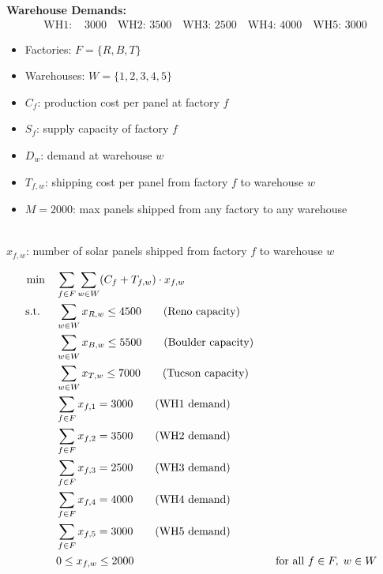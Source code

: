 \textbf{Warehouse Demands:}
\[
\begin{aligned}
\text{WH1: } & 3000 \quad \text{WH2: } 3500 \quad \text{WH3: } 2500 \quad \text{WH4: } 4000 \quad \text{WH5: } 3000
\end{aligned}
\]

\begin{solution}

\smallskip {}
\begin{itemize}
\item Factories: \( F = \{R, B, T\} \)
\item Warehouses: \( W = \{1, 2, 3, 4, 5\} \)
\end{itemize}

\smallskip {}
\begin{itemize}
\item \( C_f \): production cost per panel at factory \( f \)
\item \( S_f \): supply capacity of factory \( f \)
\item \( D_w \): demand at warehouse \( w \)
\item \( T_{f,w} \): shipping cost per panel from factory \( f \) to warehouse \( w \)
\item \( M = 2000 \): max panels shipped from any factory to any warehouse
\end{itemize}

\smallskip {} \\
\( x_{f,w} \): number of solar panels shipped from factory \( f \) to warehouse \( w \)

\smallskip {}
\begin{align*}
\min \quad & \sum_{f \in F} \sum_{w \in W} (C_f + T_{f,w}) \cdot x_{f,w} \\
\mbox{ s.t. } \quad 
& \sum_{w \in W} x_{R,w} \leq 4500   \tag{Reno capacity} \\
& \sum_{w \in W} x_{B,w} \leq 5500   \tag{Boulder capacity} \\
& \sum_{w \in W} x_{T,w} \leq 7000   \tag{Tucson capacity} \\
& \sum_{f \in F} x_{f,1} = 3000   \tag{WH1 demand} \\
& \sum_{f \in F} x_{f,2} = 3500   \tag{WH2 demand} \\
& \sum_{f \in F} x_{f,3} = 2500   \tag{WH3 demand} \\
& \sum_{f \in F} x_{f,4} = 4000   \tag{WH4 demand} \\
& \sum_{f \in F} x_{f,5} = 3000   \tag{WH5 demand} \\
& 0 \leq x_{f,w} \leq 2000 &&\quad \mbox{for all } f \in F,\; w \in W \\
\end{align*}

\end{solution}

